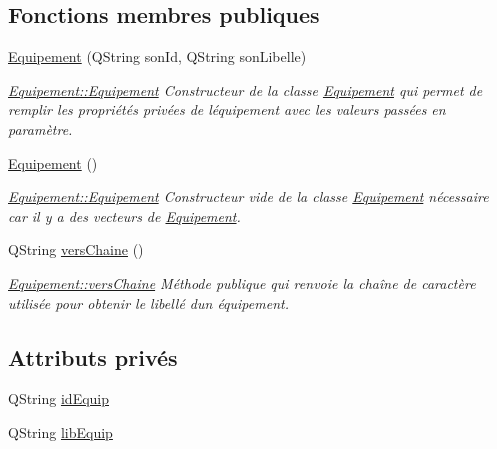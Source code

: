 \subsection*{Fonctions membres publiques}
\begin{DoxyCompactItemize}
\item 
\hyperlink{class_equipement_a7017dfb537dadbaddac0d8006d96500b}{Equipement} (Q\+String son\+Id, Q\+String son\+Libelle)
\begin{DoxyCompactList}\small\item\em \hyperlink{class_equipement_a7017dfb537dadbaddac0d8006d96500b}{Equipement\+::\+Equipement} Constructeur de la classe \hyperlink{class_equipement}{Equipement} qui permet de remplir les propriétés privées de l\textquotesingle{}équipement avec les valeurs passées en paramètre. \end{DoxyCompactList}\item 
\hyperlink{class_equipement_a9057a4777d006cbac4c72d09a8d09407}{Equipement} ()
\begin{DoxyCompactList}\small\item\em \hyperlink{class_equipement_a7017dfb537dadbaddac0d8006d96500b}{Equipement\+::\+Equipement} Constructeur vide de la classe \hyperlink{class_equipement}{Equipement} nécessaire car il y a des vecteurs de \hyperlink{class_equipement}{Equipement}. \end{DoxyCompactList}\item 
Q\+String \hyperlink{class_equipement_a5e45c0b5524b353c77a23b618d73a1d0}{vers\+Chaine} ()
\begin{DoxyCompactList}\small\item\em \hyperlink{class_equipement_a5e45c0b5524b353c77a23b618d73a1d0}{Equipement\+::vers\+Chaine} Méthode publique qui renvoie la chaîne de caractère utilisée pour obtenir le libellé d\textquotesingle{}un équipement. \end{DoxyCompactList}\end{DoxyCompactItemize}
\subsection*{Attributs privés}
\begin{DoxyCompactItemize}
\item 
Q\+String \hyperlink{class_equipement_a140b7498ba59bdacb3f57a924b2853ad}{id\+Equip}
\item 
Q\+String \hyperlink{class_equipement_a69e0291bded262f34fe2ba57ad4cf99a}{lib\+Equip}
\end{DoxyCompactItemize}


